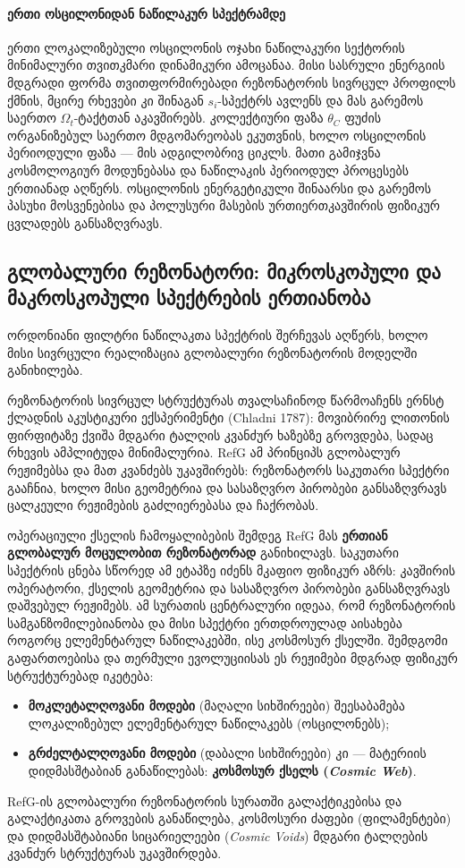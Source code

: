 \documentclass[11pt,a4paper]{article}
\begin{document}
\paragraph{ერთი ოსცილონიდან ნაწილაკურ სპექტრამდე}

ერთი ლოკალიზებული ოსცილონის ოჯახი ნაწილაკური სექტორის მინიმალური თვითკმარი დინამიკური ამოცანაა. მისი სასრული ენერგიის მდგრადი ფორმა თვითფორმირებადი რეზონატორის სივრცულ პროფილს ქმნის, მცირე რხევები კი შინაგან $s_i$-სპექტრს ავლენს და მას გარემოს საერთო $\Omega_t$-ტაქტთან აკავშირებს. კოლექტიური ფაზა $\theta_C$ ფუძის ორგანიზებულ საერთო მდგომარეობას ეკუთვნის, ხოლო ოსცილონის პერიოდული ფაზა — მის ადგილობრივ ციკლს. მათი გამიჯვნა კოსმოლოგიურ მოდუნებასა და ნაწილაკის პერიოდულ პროცესებს ერთიანად აღწერს. ოსცილონის ენერგეტიკული შინაარსი და გარემოს პასუხი მოსვენებისა და პოლუსური მასების ურთიერთკავშირის ფიზიკურ ცვლადებს განსაზღვრავს.


\subsection{გლობალური რეზონატორი: მიკროსკოპული და მაკროსკოპული სპექტრების ერთიანობა}

ორდონიანი ფილტრი ნაწილაკთა სპექტრის შერჩევას აღწერს, ხოლო მისი სივრცული რეალიზაცია გლობალური რეზონატორის მოდელში განიხილება.

რეზონატორის სივრცულ სტრუქტურას თვალსაჩინოდ წარმოაჩენს ერნსტ ქლადნის აკუსტიკური ექსპერიმენტი (Chladni 1787): მოვიბრირე ლითონის ფირფიტაზე ქვიშა მდგარი ტალღის კვანძურ ხაზებზე გროვდება, სადაც რხევის ამპლიტუდა მინიმალურია. RefG ამ პრინციპს გლობალურ რეჟიმებსა და მათ კვანძებს უკავშირებს: რეზონატორს საკუთარი სპექტრი გააჩნია, ხოლო მისი გეომეტრია და სასაზღვრო პირობები განსაზღვრავს ცალკეული რეჟიმების გაძლიერებასა და ჩაქრობას.

ოპერაციული ქსელის ჩამოყალიბების შემდეგ RefG მას \textbf{ერთიან გლობალურ მოცულობით რეზონატორად} განიხილავს. საკუთარი სპექტრის ცნება სწორედ ამ ეტაპზე იძენს მკაფიო ფიზიკურ აზრს: კავშირის ოპერატორი, ქსელის გეომეტრია და სასაზღვრო პირობები განსაზღვრავს დაშვებულ რეჟიმებს. ამ სურათის ცენტრალური იდეაა, რომ რეზონატორის სამგანზომილებიანობა და მისი სპექტრი ერთდროულად აისახება როგორც ელემენტარულ ნაწილაკებში, ისე კოსმოსურ ქსელში. შემდგომი გაფართოებისა და თერმული ევოლუციისას ეს რეჟიმები მდგრად ფიზიკურ სტრუქტურებად იკეტება:

\begin{itemize}
\item \textbf{მოკლეტალღოვანი მოდები} (მაღალი სიხშირეები) შეესაბამება ლოკალიზებულ ელემენტარულ ნაწილაკებს (ოსცილონებს);
\item \textbf{გრძელტალღოვანი მოდები} (დაბალი სიხშირეები) კი — მატერიის დიდმასშტაბიან განაწილებას: \textbf{კოსმოსურ ქსელს (\emph{Cosmic Web})}.

\end{itemize}
RefG-ის გლობალური რეზონატორის სურათში გალაქტიკებისა და გალაქტიკათა გროვების განაწილება, კოსმოსური ძაფები (ფილამენტები) და დიდმასშტაბიანი სიცარიელეები (\emph{Cosmic Voids}) მდგარი ტალღების კვანძურ სტრუქტურას უკავშირდება.
\end{document}

